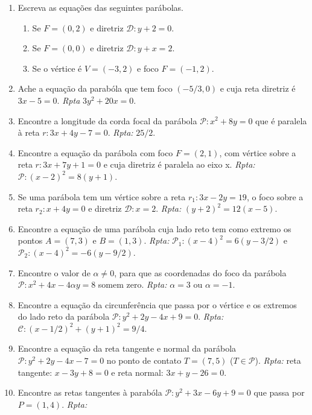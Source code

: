 \documentclass{article}
\begin{document}
  \begin{enumerate}
     \item Escreva as equações das seguintes parábolas.
       \begin{enumerate}
        \item Se $F=(0,2)$ e diretriz $\mathcal{D}: y+2=0$.
        \item Se $F=(0,0)$ e diretriz $\mathcal{D}: y+x=2$.
        \item Se o vértice é $V=(-3,2)$ e foco $F=(-1,2)$.
       \end{enumerate}
     \item Ache a equação da parabóla que tem foco
     $(-5/3,0)$ e cuja reta diretriz é $3x-5=0$.
     {\it Rpta} $3y^2+20x=0$.
     \item Encontre a longitude da corda focal da parábola
     $\mathcal{P}: x^2+8y=0$ que é paralela à reta 
     $r: 3x+4y-7=0$. {\it Rpta: } $25/2$.
     \item Encontre a equação da parábola com foco $F=(2,1)$, 
     com vértice sobre a reta $r: 3x+7y+1=0$ e 
     cuja diretriz é paralela ao eixo x. 
     {\it Rpta: } $\mathcal{P}: (x-2)^2=8(y+1)$.
     \item Se uma parábola tem um vértice sobre a
      reta $r_1:3x-2y=19$, o foco sobre a 
      reta $r_2: x+4y=0$ e 
      diretriz $\mathcal{D}: x=2$.
      {\it Rpta: } $(y+2)^{2}=12(x-5)$.
     \item Encontre a equação de uma parábola cuja lado reto 
     tem como extremo os pontos 
     $A=(7,3)$ e $B=(1,3)$. 
     {\it Rpta: } $\mathcal{P}_1:(x-4)^2=6(y-3/2)$
     e  $\mathcal{P}_2:(x-4)^2=-6(y-9/2)$.
     \item Encontre o valor de $\alpha \neq 0$, para que as 
     coordenadas do foco da parábola 
     $\mathcal{P}: x^2+4x-4\alpha y=8$ somem zero.
     {\it Rpta: } $\alpha=3$ ou $\alpha=-1$.
     \item Encontre a equação da circunferência 
     que passa por o vértice 
     e os extremos do lado reto da parábola 
     $\mathcal{P}: y^2+2y-4x+9=0$. 
     {\it Rpta: } $\mathcal{C}: (x-1/2)^2+(y+1)^2=9/4$.
     \item Encontre a equação da reta tangente e normal 
     da parábola $\mathcal{P}: y^2+2y-4x-7=0$ no ponto de contato 
     $T=(7,5)$ ($T \in \mathcal{P}$). {\it Rpta: }
     reta tangente: $x-3y+8=0$ e reta normal: $3x+y-26=0$.
     \item Encontre as retas tangentes à parabóla 
     $\mathcal{P}: y^2+3x-6y+9=0$ que passa por 
     $P=(1,4)$. {\it Rpta: }

\end{enumerate}
\end{document}
